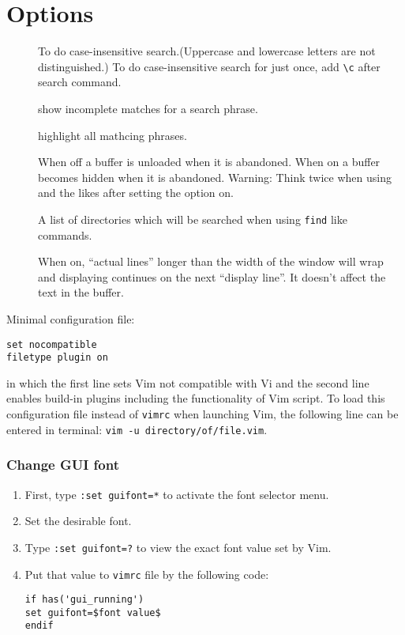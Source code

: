 \part{Options}
\begin{description}
  \item[]  To do case-insensitive search.(Uppercase and lowercase letters are not distinguished.) To do case-insensitive search for just once, add \verb|\c| after search command.
  \item[] show incomplete matches for a search phrase.
  \item[] highlight all mathcing phrases.
  \item[] When off a buffer is unloaded when it is abandoned.  When on a buffer becomes hidden when it is abandoned. Warning: Think twice when using  and the likes after setting the  option on.
  \item[] A list of directories which will be searched when using \verb|find| like commands.
  \item[] When on, ``actual lines'' longer than the width of the window will wrap and displaying continues on the next ``display line''. It doesn't affect the text in the buffer.
\end{description}

Minimal configuration file:
\begin{verbatim}
set nocompatible
filetype plugin on
\end{verbatim}
in which the first line sets Vim not compatible with Vi and the second line enables build-in plugins including the functionality of Vim script.
To load this configuration file instead of \verb|vimrc| when launching Vim, the following line can be entered in terminal: \verb|vim -u directory/of/file.vim|.
\section{Change GUI font}
\begin{enumerate}
  \item First, type \verb|:set guifont=*| to activate the font selector menu.
  \item Set the desirable font.
  \item Type \verb|:set guifont=?| to view the exact font value set by Vim.
  \item Put that value to \verb|vimrc| file by the following code:
    \begin{lstlisting}
if has('gui_running')
set guifont=$font value$
endif
    \end{lstlisting}
\end{enumerate}

